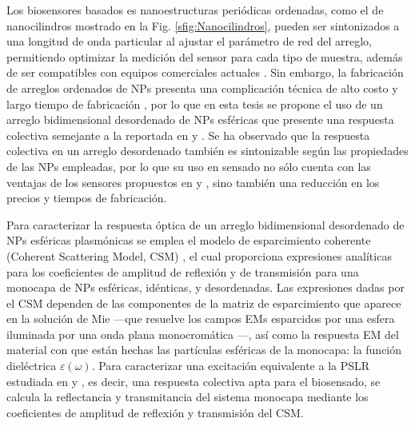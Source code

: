Los biosensores basados es nanoestructuras periódicas ordenadas, como el de nanocilindros mostrado en la Fig. \ref{sfig:Nanocilindros}, pueden ser sintonizados a una longitud de onda particular al ajustar el parámetro de red del arreglo, permitiendo optimizar la medición del sensor para cada tipo de muestra, además de ser compatibles con equipos comerciales actuales \cite{kabashin2009plasmonic}.  Sin embargo, la fabricaci\'on de arreglos ordenados de NPs presenta una complicaci\'on t\'ecnica de alto costo y largo tiempo de fabricación \cite{estevez2014trends}, por lo que en esta tesis se propone el uso de un arreglo bidimensional desordenado de NPs esféricas que presente una respuesta colectiva semejante a la reportada en \cite{kabashin2009plasmonic} y \cite{danilov2018ultra}. Se ha observado que la respuesta colectiva en un arreglo desordenado también es sintonizable según las propiedades de las NPs empleadas, por lo que su uso en sensado no sólo cuenta con las ventajas de los sensores propuestos en \cite{kabashin2009plasmonic} y \cite{danilov2018ultra}, sino también una reducción en los precios y tiempos de fabricación. 

Para  caracterizar la respuesta óptica de un arreglo bidimensional desordenado de NPs esféricas plasmónicas se emplea el modelo de esparcimiento coherente (Coherent Scattering Model, CSM) \cite{reyes2018analytical}, el cual proporciona expresiones analíticas para los coeficientes de amplitud de reflexión y de transmisión para una monocapa de NPs esféricas, idénticas, y desordenadas.  Las expresiones  dadas por el CSM dependen de las componentes de la matriz de esparcimiento que aparece en la solución de Mie ---que resuelve los campos EMs esparcidos por una esfera iluminada por una onda plana monocromática \cite{bohren1998absorption}---, así como la respuesta EM del material con que están hechas las partículas esféricas de la monocapa: la función dieléctrica $\varepsilon(\omega)$.  Para caracterizar una excitación equivalente a la PSLR estudiada en \cite{kabashin2009plasmonic} y \cite{danilov2018ultra}, es decir, una respuesta colectiva apta para el biosensado, se calcula la reflectancia y transmitancia del sistema monocapa mediante los coeficientes de amplitud de reflexión y transmisión del CSM. 
 
